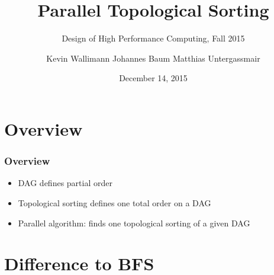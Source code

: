 

\author[]{Kevin Wallimann \quad Johannes Baum \quad Matthias Untergassmair}


\title[Topological Sorting]{Parallel Topological Sorting} %
\subtitle{Design of High Performance Computing, Fall 2015}

\date{December 14, 2015}
	

\begin{frame}
\titlepage %
\end{frame}


\section{Overview}


\begin{frame}
\frametitle{Overview}

\begin{itemize}
\item DAG defines partial order
\item Topological sorting defines one total order on a DAG
\item Parallel algorithm: finds one topological sorting of a given DAG
\end{itemize}

\end{frame}

\section{Difference to BFS}

